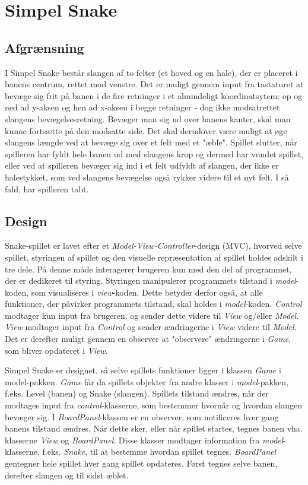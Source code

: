 \documentclass{report}
\begin{document}
\chapter{Simpel Snake}
\section{Afgrænsning}
I Simpel Snake består slangen af to felter (et hoved og en hale), der er placeret i banens centrum, rettet mod venstre. Det er muligt gennem input fra tastaturet at bevæge sig frit på banen i de fire retninger i et almindeligt koordinatsytem: op og ned ad y-aksen og hen ad x-aksen i begge retninger - dog ikke modsatrettet slangens bevægelsesretning. Bevæger man sig ud over banens kanter, skal man kunne fortsætte på den modsatte side. Det skal derudover være muligt at øge slangens længde ved at bevæge sig over et felt med et "æble". Spillet slutter, når spilleren har fyldt hele banen ud med slangens krop og dermed har vundet spillet, eller ved at spilleren bevæger sig ind i et felt udfyldt af slangen, der ikke er halestykket, som ved slangens bevægelse også rykker videre til et nyt felt. I så fald, har spilleren tabt.

\section{Design}
Snake-spillet er lavet efter et \textit{Model-View-Controller}-design (MVC), hvorved selve spillet, styringen af spillet og den visuelle repræsentation af spillet holdes adskilt i tre dele. På denne måde interagerer brugeren kun med den del af programmet, der er dedikeret til styring. Styringen manipulerer programmets tilstand i \textit{model}-koden, som visualiseres i \textit{view}-koden. Dette betyder derfor også, at alle funktioner, der påvirker programmets tilstand, skal holdes i \textit{model}-koden. \textit{Control} modtager kun input fra brugeren, og sender dette videre til \textit{View} og/eller \textit{Model}. \textit{View} modtager input fra \textit{Control} og sender ændringerne i \textit{View} videre til \textit{Model}. Det er derefter muligt gennem en observer at "observere" ændringerne i \textit{Game}, som bliver opdateret i \textit{View}.

Simpel Snake er designet, så selve spillets funktioner ligger i klassen \textit{Game} i model-pakken. \textit{Game} får da spillets objekter fra andre klasser i \textit{model}-pakken, f.eks. Level (banen) og Snake (slangen). Spillets tilstand ændres, når der modtages input fra \textit{control}-klasserne, som bestemmer hvornår og hvordan slangen bevæger sig. I \textit{BoardPanel}-klassen er en observer, som notificeres hver gang banens tilstand ændres. Når dette sker, eller når spillet startes, tegnes banen vha. klasserne \textit{View} og \textit{BoardPanel}. Disse klasser modtager information fra \textit{model}-klasserne, f.eks. \textit{Snake}, til at bestemme hvordan spillet tegnes. \textit{BoardPanel} gentegner hele spillet hver gang spillet opdateres. Først tegnes selve banen, derefter slangen og til sidst æblet. 
\end{document}
